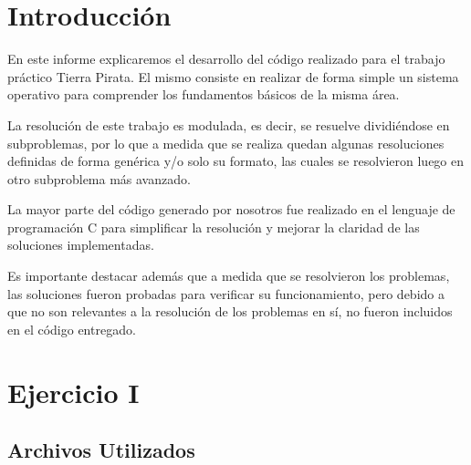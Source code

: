 \documentclass[a4paper]{article}
\begin{document}
\thispagestyle{empty}

\maketitle
\newpage

\thispagestyle{empty}
\vfill

\thispagestyle{empty}
\vspace{3cm}
\tableofcontents
\newpage


\newpage

\section{Introducción}

En este informe explicaremos el desarrollo del código realizado para el trabajo práctico Tierra Pirata. El mismo consiste en realizar de forma simple un sistema operativo para comprender los fundamentos básicos de la misma área. 
\par La resolución de este trabajo es modulada, es decir, se resuelve dividiéndose en subproblemas, por lo que a medida que se realiza quedan algunas resoluciones definidas de forma genérica y/o solo su formato, las cuales se resolvieron luego en otro subproblema más avanzado.
\par La mayor parte del código generado por nosotros fue realizado en el lenguaje de programación C para simplificar la resolución y mejorar la claridad de las soluciones implementadas.
\par Es importante destacar además que a medida que se resolvieron los problemas, las soluciones fueron probadas para verificar su funcionamiento, pero debido a que no son relevantes a la resolución de los problemas en sí, no fueron incluidos en el código entregado.


\newpage
\section{Ejercicio I}

\subsection{Archivos Utilizados}
\end{document}
